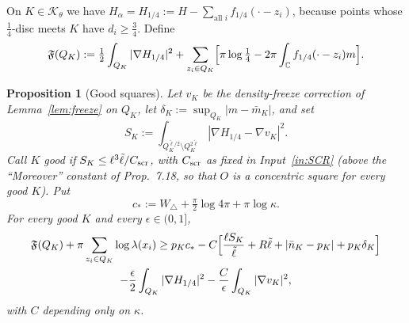 \documentclass[11pt]{article}
\newtheorem{proposition}[theorem]{Proposition}
\theoremstyle{definition}
\theoremstyle{remark}
\newcommand{\C}{\mathbb C}
\newcommand{\Wtri}{W_{\triangle}}
\begin{document}
On $K\in\mathcal K_\theta$ we have $H_\alpha=H_{1/4}:=H-\sum_{\text{all }i}f_{1/4}(\cdot-z_i)$,
because points whose $\tfrac14$-disc meets $K$ have $d_i\ge\tfrac34$. Define
\[
\mathfrak F(Q_K):=\tfrac12\int_{Q_K}|\nabla H_{1/4}|^2+\sum_{z_i\in Q_K}\Bigl[\pi\log\tfrac14-2\pi\int_\C f_{1/4}(\cdot-z_i)m\Bigr].
\]

\begin{proposition}[Good squares]\label{prop:goodsquare}
Let $v_K$ be the density-freeze correction of Lemma~\ref{lem:freeze} on $Q_K$, let
$\delta_K:=\sup_{Q_K}|m-\bar m_K|$, and set
\[
S_K:=\int_{Q_K^{\tilde\ell/2}\setminus Q_K^{2\tilde\ell}}|\nabla H_{1/4}-\nabla v_K|^2 .
\]
Call $K$ \emph{good} if $S_K\le\ell^3\tilde\ell/C_{\rm scr}$, with $C_{\rm scr}$ as fixed in
Input~\ref{in:SCR} (above the ``Moreover'' constant of Prop.~7.18, so that $O$ is a concentric
square for every good $K$). Put
\[
c_*:=\Wtri+\tfrac\pi2\log4\pi+\pi\log\kappa .
\]
For every good $K$ and every $\epsilon\in(0,1]$,
\begin{multline*}
\mathfrak F(Q_K)+\pi\sum_{z_i\in Q_K}\log\lambda(x_i)\ge p_Kc_*
-C\Bigl[\frac{\ell S_K}{\tilde\ell}+R\tilde\ell+|\bar n_K-p_K|+p_K\delta_K\Bigr]\\
-\frac\epsilon2\int_{Q_K}|\nabla H_{1/4}|^2-\frac C\epsilon\int_{Q_K}|\nabla v_K|^2,
\end{multline*}
with $C$ depending only on $\kappa$.
\end{proposition}
\end{document}
